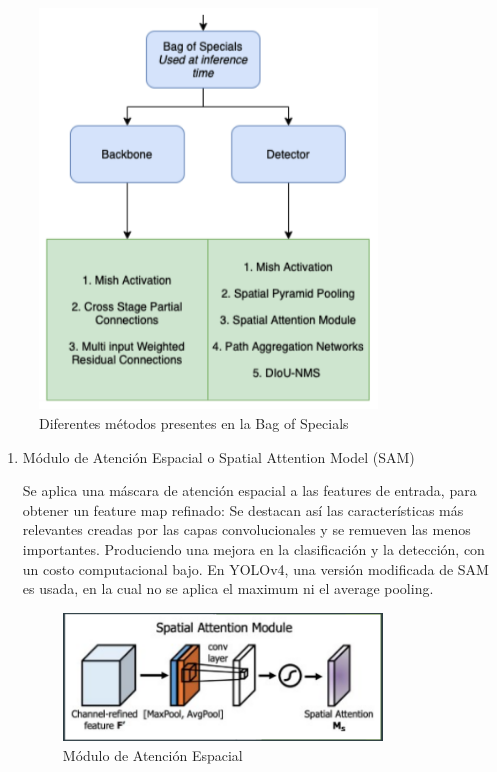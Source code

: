 \begin{figure}[h!]
        \centering
        \includegraphics[width=0.8\textwidth]{img/BagOfSpecials.png}
        \caption{Diferentes métodos presentes en la Bag of Specials}
        \label{fig:bag-of-specials}
    \end{figure}

\begin{enumerate}
    \item {Módulo de Atención Espacial o Spatial Attention Model (SAM)}

    Se aplica una máscara de atención espacial a las features de entrada, para obtener un feature map refinado: Se destacan así las características más relevantes creadas por las capas convolucionales y se remueven las menos importantes. 
    Produciendo una mejora en la clasificación y la detección, con un costo computacional bajo.
    En YOLOv4, una versión modificada de SAM \cite{yolov4} es usada, en la cual no se aplica el maximum ni el average pooling. 
    \\
    
    \begin{figure}[h!]
        \centering
        \includegraphics[width=0.8\textwidth]{img/SAM.png}
        \caption{Módulo de Atención Espacial \cite{sam1}}
        \label{fig:sam}
    \end{figure}
\end{enumerate}


